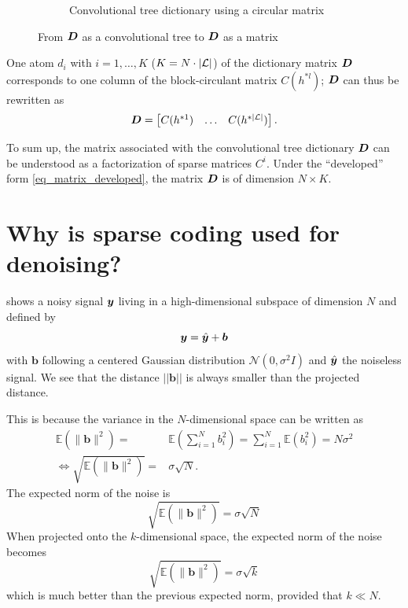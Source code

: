 \begin{figure}[!ht]
\begin{subfigure}[b]{0.69\textwidth}
\caption{Convolutional tree dictionary using a circular matrix}
\end{subfigure}
\caption{From $\bm{D}$ as a convolutional tree to $\bm{D}$ as a matrix}\label{fig_tree_as_matrix}
\end{figure}

\noindent
One atom $d_i$ with $i = 1,\dots,K$ ($K=N \cdot |\mathcal L|$) of the dictionary matrix $\bm{D}$ corresponds to one column of the block-circulant matrix $C(h^{*l})$; $\bm{D}$ can thus be rewritten as
\begin{align}\bm{D} = \begin{bmatrix} C(h^{*1}) & \dots & C(h^{*{|\mathcal L|}}) \end{bmatrix}.\label{eq_matrix_factorized} \end{align}

\noindent
To sum up, the matrix associated with the convolutional tree dictionary $\bm{D}$ can be understood as a factorization of sparse matrices $C^i$. Under the “developed” form \eqref{eq_matrix_developed}, the matrix $\bm{D}$ is of dimension $N \times K$.




\FloatBarrier
\section{Why is sparse coding used for denoising?}

 shows a noisy signal $\bm{y}$ living in a high-dimensional subspace of dimension $N$ and defined by
\begin{equation*}\bm{y}=\hat{\bm{y}} + \bm{b}\end{equation*}
with $\bm{b}$ following a centered Gaussian distribution $\mathcal{N}(0,\sigma^2I)$ and $\hat{\bm{y}}$ the noiseless signal. We see that the distance $||\bm{b}||$ is always smaller than the projected distance.

\noindent
This is because the variance in the $N$-dimensional space can be written as
\begin{align*}
\mathbb{E}\left(\lVert \bm{b} \rVert^2 \right) =& \mathbb{E}\left(\sum^N_{i=1} b_i^2 \right) = \sum^N_{i=1} \mathbb{E}(b_i^2)  = N\sigma^2 \\
\Leftrightarrow \sqrt{\mathbb{E}\left(\lVert \bm{b} \rVert^2 \right)} =& \sigma \sqrt{N}.
\end{align*}
The expected norm of the noise is
\begin{equation*} \sqrt{\mathbb{E}\left(\lVert \bm{b} \rVert^2 \right)} = \sigma\sqrt{N} \end{equation*}
When projected onto the $k$-dimensional space, the expected norm of the noise becomes
\begin{equation*}\sqrt{\mathbb{E}\left(\lVert \bm{b} \rVert^2 \right)} = \sigma\sqrt{k} \end{equation*}
which is much better than the previous expected norm, provided that $k \ll N$.

